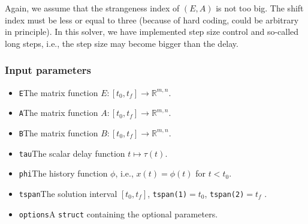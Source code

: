 \documentclass[final,reqno]{siamltex}
\begin{document}
Again, we assume that the strangeness index of $(E,A)$ is not too big. The shift index must be less or equal to three (because of hard coding, could be arbitrary in principle). 
In this solver, we have implemented step size control and so-called long steps, i.e.,  the step size may become bigger than the delay. 

\subsubsection{Input parameters}
\begin{itemize}
\item {\tt E}\quad The matrix function $E:[t_0,t_f]\rightarrow \mathbb{R}^{m,n}$.
\item {\tt A}\quad The matrix function $A:[t_0,t_f]\rightarrow \mathbb{R}^{m,n}$.
\item {\tt B}\quad The matrix function $B:[t_0,t_f]\rightarrow \mathbb{R}^{m,n}$.
\item {\tt tau}\quad  The scalar delay function $t\mapsto \tau(t)$.
\item {\tt phi}\quad The history function $\phi$, i.e.,  $x(t)=\phi(t)$ for $t < t_0$.
\item {\tt tspan}\quad The solution interval $[t_0,t_f]$, {\tt tspan(1)}$ = t_0$, {\tt tspan(2)}$ = t_f$ .
\item {\tt options}\quad A {\tt struct} containing the optional parameters.
\end{itemize}
\end{document}
